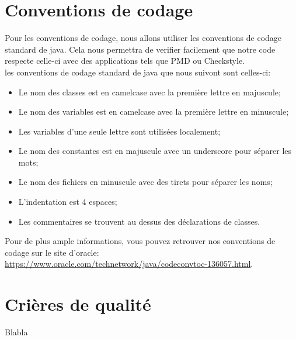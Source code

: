 \documentclass[a4paper,11pt]{article}
\begin{document}
\section{Conventions de codage}
Pour les conventions de codage, nous allons utiliser les conventions de codage standard de java.
Cela nous permettra de verifier facilement que notre code respecte celle-ci avec des applications tels que PMD ou Checkstyle.\\
les conventions de codage standard de java que nous suivont sont celles-ci:
\begin{itemize}
  \item Le nom des classes est en camelcase avec la première lettre en majuscule;
  \item Le nom des variables est en camelcase avec la première lettre en minuscule;
  \item Les variables d'une seule lettre sont utilisées localement;
  \item Le nom des constantes est en majuscule avec un underscore pour séparer les mots;
  \item Le nom des fichiers en minuscule avec des tirets pour séparer les noms;
  \item L'indentation est 4 espaces;
  \item Les commentaires se trouvent au dessus des déclarations de classes.
\end{itemize}
Pour de plus ample informations, vous pouvez retrouver nos conventions de codage sur le site d'oracle:
\url{https://www.oracle.com/technetwork/java/codeconvtoc-136057.html}.

\section{Crières de qualité}
Blabla
\end{document}

